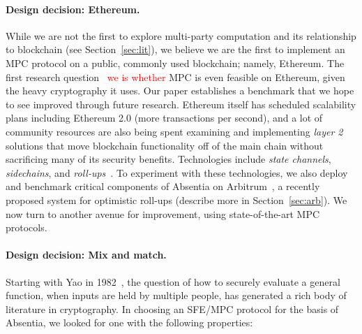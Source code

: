\paragraph{Design decision: Ethereum.} While we are not the first to explore multi-party computation and its relationship to blockchain (see Section~\ref{sec:lit}), we believe we are the first to implement an MPC protocol on a public, commonly used blockchain; namely, Ethereum. The first research question ~\textcolor{red}{we is whether} MPC is even feasible on Ethereum, given the heavy cryptography it uses. Our paper establishes a benchmark that we hope to see improved through future research. Ethereum itself has scheduled scalability plans including Ethereum 2.0 (more transactions per second), and a lot of community resources are also being spent examining and implementing \emph{layer 2} solutions that move blockchain functionality off of the main chain without sacrificing many of its security benefits. Technologies include \emph{state channels}, \emph{sidechains}, and \emph{roll-ups}~\cite{GMR+20}. To experiment with these technologies, we also deploy and benchmark critical components of Absentia on Arbitrum~\cite{KGCWF18}, a recently proposed system for optimistic roll-ups (describe more in Section~\ref{sec:arb}). We now turn to another avenue for improvement, using state-of-the-art MPC protocols.

\paragraph{Design decision: Mix and match.} Starting with Yao in 1982~\cite{Yao82}, the question of how to securely evaluate a general function, when inputs are held by multiple people, has generated a rich body of literature in cryptography. In choosing an SFE/MPC protocol for the basis of Absentia, we looked for one with the following properties:

